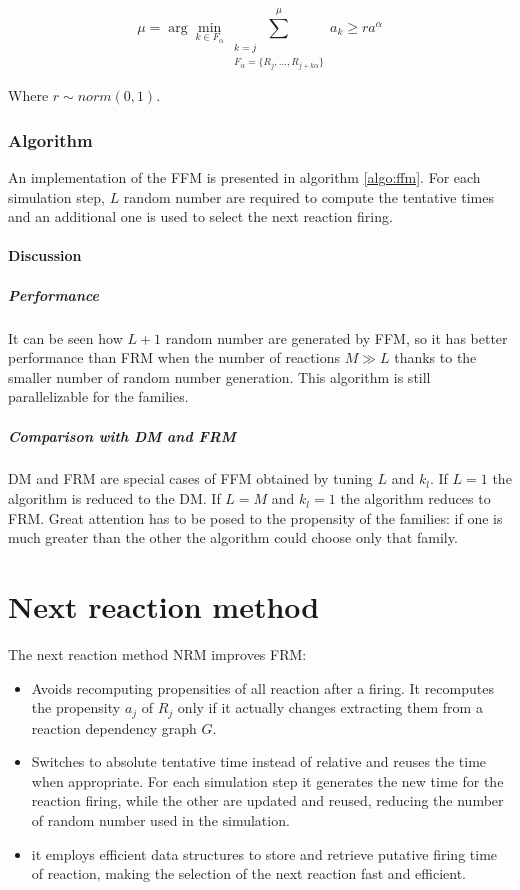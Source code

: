       $$\mu = \arg\min\limits_{k\in F_\alpha}\sum\limits_{\substack{k=j\\F_\alpha = \{R_j, \dots, R_{j+k\alpha}\}}}^\mu a_k\ge ra^\alpha$$

      Where $r\sim norm(0,1)$.

    \subsubsection{Algorithm}
    An implementation of the FFM is presented in algorithm \ref{algo:ffm}.
    For each simulation step, $L$ random number are required to compute the tentative times and an additional one is used to select the next reaction firing.

    

      \paragraph{Discussion}

        \subparagraph{Performance}
        It can be seen how $L+1$ random number are generated by FFM, so it has better performance than FRM when the number of reactions $M\gg L$ thanks to the smaller number of random number generation.
        This algorithm is still parallelizable for the families.

        \subparagraph{Comparison with DM and FRM}
        DM and FRM are special cases of FFM obtained by tuning $L$ and $k_l$.
        If $L=1$ the algorithm is reduced to the DM.
        If $L=M$ and $k_l=1$ the algorithm reduces to FRM.
        Great attention has to be posed to the propensity of the families: if one is much greater than the other the algorithm could choose only that family.

\section{Next reaction method}
The next reaction method NRM improves FRM:

\begin{multicols}{2}
  \begin{itemize}
    \item Avoids recomputing propensities of all reaction after a firing.
      It recomputes the propensity $a_j$ of $R_j$ only if it actually changes extracting them from a reaction dependency graph $G$.
    \item Switches to absolute tentative time instead of relative and reuses the time when appropriate.
      For each simulation step it generates the new time for the reaction firing, while the other are updated and reused, reducing the number of random number used in the simulation.
    \item it employs efficient data structures to store and retrieve putative firing time of reaction, making the selection of the next reaction fast and efficient.
  \end{itemize}
\end{multicols}

